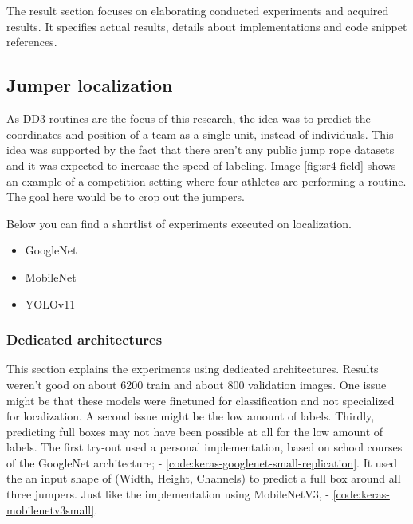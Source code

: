 
\chapter{}%
\label{ch:results}

The result section focuses on elaborating conducted experiments and acquired results. It specifies actual results, details about implementations and code snippet references.

\section{Jumper localization}
\label{results:jumper-localization}

As DD3 routines are the focus of this research, the idea was to predict the coordinates and position of a team as a single unit, instead of individuals. This idea was supported by the fact that there aren't any public jump rope datasets and it was expected to increase the speed of labeling. Image \ref{fig:sr4-field} shows an example of a competition setting where four athletes are performing a routine. The goal here would be to crop out the jumpers.


Below you can find a shortlist of experiments executed on localization.

\begin{itemize}
    \item GoogleNet
    \item MobileNet
    \item YOLOv11
\end{itemize}

\subsection{Dedicated architectures}

This section explains the experiments using dedicated architectures. Results weren't good on about 6200 train and about 800 validation images. One issue might be that these models were finetuned for classification and not specialized for localization. A second issue might be the low amount of labels. Thirdly, predicting full boxes may not have been possible at all for the low amount of labels.
The first try-out used a personal implementation, based on school courses of the GoogleNet architecture; \autocite{Szegedy2014} - \ref{code:keras-googlenet-small-replication}.
It used the an input shape of (Width, Height, Channels) to predict a full box around all three jumpers. Just like the implementation using MobileNetV3, \autocite{Howard2019} - \ref{code:keras-mobilenetv3small}.


